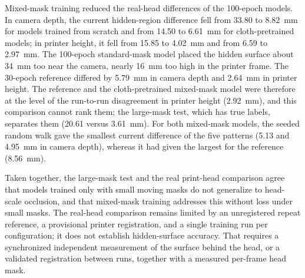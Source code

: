 Mixed-mask training reduced the real-head differences of the 100-epoch models. In camera depth, the current hidden-region difference fell from 33.80 to 8.82~mm for models trained from scratch and from 14.50 to 6.61~mm for cloth-pretrained models; in printer height, it fell from 15.85 to 4.02~mm and from 6.59 to 2.97~mm. The 100-epoch standard-mask model placed the hidden surface about 34~mm too near the camera, nearly 16~mm too high in the printer frame. The 30-epoch reference differed by 5.79~mm in camera depth and 2.64~mm in printer height. The reference and the cloth-pretrained mixed-mask model were therefore at the level of the run-to-run disagreement in printer height (2.92~mm), and this comparison cannot rank them; the large-mask test, which has true labels, separates them (20.61 versus 3.61~mm). For both mixed-mask models, the seeded random walk gave the smallest current difference of the five patterns (5.13 and 4.95~mm in camera depth), whereas it had given the largest for the reference (8.56~mm).

Taken together, the large-mask test and the real print-head comparison agree that models trained only with small moving masks do not generalize to head-scale occlusion, and that mixed-mask training addresses this without loss under small masks. The real-head comparison remains limited by an unregistered repeat reference, a provisional printer registration, and a single training run per configuration; it does not establish hidden-surface accuracy. That requires a synchronized independent measurement of the surface behind the head, or a validated registration between runs, together with a measured per-frame head mask.


